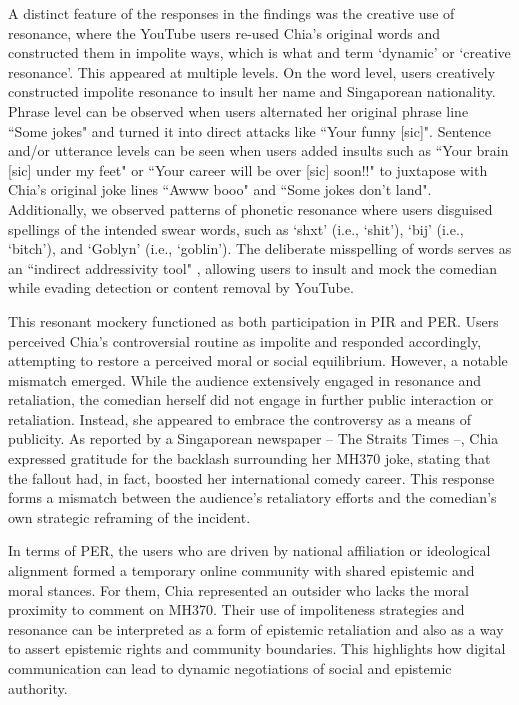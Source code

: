 \documentclass[english]{textolivre}
\begin{document}
A distinct feature of the responses in the findings was the creative use of resonance, where the YouTube users re-used Chia’s original words and constructed them in impolite ways, which is what \textcite{dubois2014} and \textcite{tantucci2021} term ‘dynamic’ or ‘creative resonance’. This appeared at multiple levels. On the word level, users creatively constructed impolite resonance to insult her name and Singaporean nationality. Phrase level can be observed when users alternated her original phrase line ``Some jokes" and turned it into direct attacks like ``Your funny [sic]". Sentence and/or utterance levels can be seen when users added insults such as ``Your brain [sic] under my feet" or ``Your career will be over [sic] soon!!" to juxtapose with Chia’s original joke lines ``Awww booo" and ``Some jokes don’t land". Additionally, we observed patterns of phonetic resonance where users disguised spellings of the intended swear words, such as ‘shxt’ (i.e., ‘shit’), ‘bij’ (i.e., ‘bitch’), and ‘Goblyn’ (i.e., ‘goblin’). The deliberate misspelling of words serves as an ``indirect addressivity tool" \cite[p. 153]{vladimirou2018}, allowing users to insult and mock the comedian while evading detection or content removal by YouTube.

This resonant mockery functioned as both participation in PIR and PER. Users perceived Chia’s controversial routine as impolite and responded accordingly, attempting to restore a perceived moral or social equilibrium. However, a notable mismatch emerged. While the audience extensively engaged in resonance and retaliation, the comedian herself did not engage in further public interaction or retaliation. Instead, she appeared to embrace the controversy as a means of publicity. As reported by a Singaporean newspaper -- The Straits Times \cite{soh2025} --, Chia expressed gratitude for the backlash surrounding her MH370 joke, stating that the fallout had, in fact, boosted her international comedy career. This response forms a mismatch between the audience’s retaliatory efforts and the comedian’s own strategic reframing of the incident. 

In terms of PER, the users who are driven by national affiliation or ideological alignment formed a temporary online community with shared epistemic and moral stances. For them, Chia represented an outsider who lacks the moral proximity to comment on MH370. Their use of impoliteness strategies and resonance can be interpreted as a form of epistemic retaliation and also as a way to assert epistemic rights and community boundaries. This highlights how digital communication can lead to dynamic negotiations of social and epistemic authority. 
\end{document}

